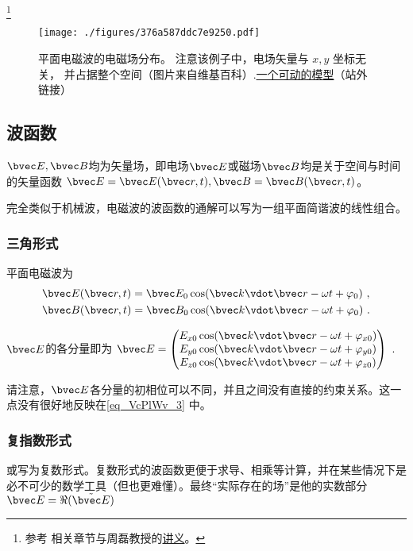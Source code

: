 

\footnote{参考 \cite{GriffE} 相关章节与周磊教授的\href{http://fdjpkc.fudan.edu.cn/d200927/2009/0314/c8569a14801/page.htm}{讲义}。}

\begin{figure}[ht]
\centering
\texttt{[image: ./figures/376a587ddc7e9250.pdf]}
\caption{平面电磁波的电磁场分布。 注意该例子中，电场矢量与 $x, y$ 坐标无关， 并占据整个空间（图片来自维基百科）.\href{https://www.geogebra.org/m/xhYwXSsH}{一个可动的模型}（站外链接）} \label{fig_VcPlWv_1}
\end{figure}

\subsection{波函数}
$\bvec E, \bvec B$均为矢量场，即电场$\bvec E$或磁场$\bvec B$均是关于空间与时间的矢量函数 $\bvec E = \bvec E(\bvec r, t), \bvec B = \bvec B(\bvec r, t)$。

完全类似于机械波，电磁波的波函数的通解可以写为一组平面简谐波的线性组合。

\subsubsection{三角形式}
平面电磁波为
\begin{align}\label{eq_VcPlWv_3}
&\bvec E(\bvec r, t) = \bvec E_0 \cos(\bvec k\vdot \bvec r - \omega t + \varphi_0)~,\\
&\bvec B(\bvec r, t) = \bvec B_0 \cos(\bvec k \vdot \bvec r - \omega t + \varphi_0)~.
\end{align}

$\bvec E$的各分量即为
$\bvec E = 
\begin{pmatrix}
E_{x0} \cos(\bvec k\vdot \bvec r - \omega t+ \varphi_{x0})\\
E_{y0} \cos(\bvec k\vdot \bvec r - \omega t+ \varphi_{y0})\\
E_{z0} \cos(\bvec k\vdot \bvec r - \omega t+ \varphi_{z0})\\
\end{pmatrix}~.
$

请注意，$\bvec E$各分量的初相位可以不同，并且之间没有直接的约束关系。这一点没有很好地反映在\autoref{eq_VcPlWv_3} 中。

\subsubsection{复指数形式}
或写为复数形式。复数形式的波函数更便于求导、相乘等计算，并在某些情况下是必不可少的数学工具（但也更难懂）。最终“实际存在的场”是他的实数部分 $\bvec E = \Re (\tilde {\bvec E})$

